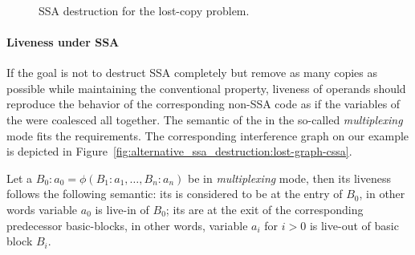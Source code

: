 \begin{figure}[H]
\hfill
\begin{minipage}{0.3\textwidth}
\\
\end{minipage}
\hfill
\begin{minipage}{0.3\textwidth}
\\\vspace{1em}~\\
\end{minipage}
\caption{SSA destruction for the lost-copy problem.\label{fig:alternative_ssa_destruction:ex_lost}}
\end{figure}

\paragraph{Liveness under SSA}
\label{sec:alternative_ssa_destruction_algorithm:liveness}
If the goal is not to destruct SSA completely but remove as many copies as possible while maintaining the conventional property, liveness of \phifun operands should reproduce the behavior of the corresponding non-SSA code as if the variables of the \phiweb were coalesced all together. 
The semantic of the \phiop in the so-called \emph{multiplexing} mode fits the requirements. 
The corresponding interference graph on our example is depicted in Figure~\ref{fig:alternative_ssa_destruction:lost-graph-cssa}.


\begin{definition}
  Let a \phifun $B_0:a_0=\phi(B_1:a_1,\dots,B_n:a_n)$ be in \emph{multiplexing} mode, then its liveness follows the following semantic: 
  its  is considered to be at the entry of $B_0$, in other words variable $a_0$ is live-in of $B_0$; 
  its \useops are at the exit of the corresponding predecessor basic-blocks, in other words, variable $a_i$ for $i>0$ is live-out of basic block $B_i$.
\end{definition}



